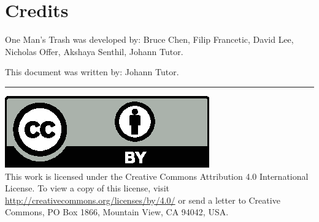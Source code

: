 \documentclass{article}
\newcommand\thegame{One Man's Trash}
\newcommand\copyrightfooter{
  \medskip
  \hrule

  {
    \small
    \includegraphics[scale=0.5]{cc-by.eps}\\
    This work is licensed under the Creative Commons Attribution 4.0
    International License. To view a copy of this license, visit
    \url{http://creativecommons.org/licenses/by/4.0/} or send a letter to Creative Commons, PO Box 1866, Mountain View, CA 94042, USA.
  }
}
\begin{document}
\newpage
\section{Credits}
\label{sec:credits}

\thegame{} was developed by:
Bruce Chen,
Filip Francetic,
David Lee,
Nicholas Offer,
Akshaya Senthil,
Johann Tutor.

This document was written by:
Johann Tutor.

\copyrightfooter
\end{document}
